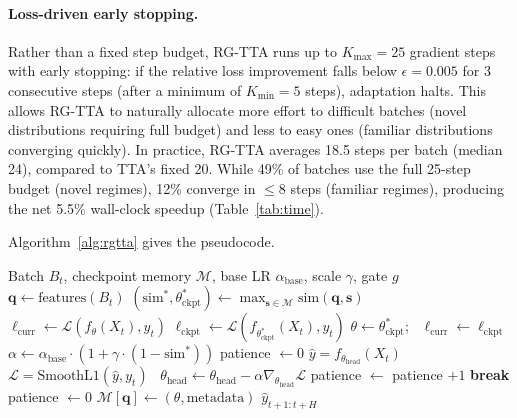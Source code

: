 \documentclass[11pt,a4paper]{article}
\begin{document}
\paragraph{Loss-driven early stopping.} Rather than a fixed step budget, RG-TTA runs up to $K_{\max} = 25$ gradient steps with early stopping: if the relative loss improvement falls below $\epsilon = 0.005$ for 3 consecutive steps (after a minimum of $K_{\min} = 5$ steps), adaptation halts. This allows RG-TTA to naturally allocate more effort to difficult batches (novel distributions requiring full budget) and less to easy ones (familiar distributions converging quickly). In practice, RG-TTA averages 18.5 steps per batch (median 24), compared to TTA's fixed 20. While 49\% of batches use the full 25-step budget (novel regimes), 12\% converge in $\leq$8 steps (familiar regimes), producing the net 5.5\% wall-clock speedup (Table~\ref{tab:time}).

Algorithm~\ref{alg:rgtta} gives the pseudocode.

\begin{algorithm}[t]
\caption{RG-TTA: Regime-Guided Test-Time Adaptation}
\label{alg:rgtta}
\begin{algorithmic}[1]
\REQUIRE Batch $B_t$, checkpoint memory $\mathcal{M}$, base LR $\alpha_{\text{base}}$, scale $\gamma$, gate $g$
\STATE $\mathbf{q} \leftarrow \text{features}(B_t)$ \hfill {}
\STATE $(\text{sim}^*, \theta^*_{\text{ckpt}}) \leftarrow \max_{\mathbf{s} \in \mathcal{M}} \text{sim}(\mathbf{q}, \mathbf{s})$ \hfill {}
\STATE $\ell_{\text{curr}} \leftarrow \mathcal{L}(f_\theta(X_t), y_t)$ \hfill {}
 \hfill {}
  \STATE $\ell_{\text{ckpt}} \leftarrow \mathcal{L}(f_{\theta^*_{\text{ckpt}}}(X_t), y_t)$
   \hfill {}
    \STATE $\theta \leftarrow \theta^*_{\text{ckpt}}$; \, $\ell_{\text{curr}} \leftarrow \ell_{\text{ckpt}}$
  \ENDIF
\ENDIF
\STATE $\alpha \leftarrow \alpha_{\text{base}} \cdot (1 + \gamma \cdot (1 - \text{sim}^*))$ \hfill {}
\STATE patience $\leftarrow 0$
  \STATE $\hat{y} = f_{\theta_{\text{head}}}(X_t)$ \hfill {}
  \STATE $\mathcal{L} = \text{SmoothL1}(\hat{y}, y_t)$~\citep{huber1964robust} \hfill {}
  \STATE $\theta_{\text{head}} \leftarrow \theta_{\text{head}} - \alpha \nabla_{\theta_{\text{head}}} \mathcal{L}$
    \STATE patience $\leftarrow$ patience $+ 1$
      \STATE \textbf{break} \hfill {}
    \ENDIF
  \ELSE
    \STATE patience $\leftarrow 0$
  \ENDIF
\ENDFOR
\STATE $\mathcal{M}[\mathbf{q}] \leftarrow (\theta, \text{metadata})$ \hfill {}
\RETURN $\hat{y}_{t+1:t+H}$
\end{algorithmic}
\end{algorithm}
\end{document}
